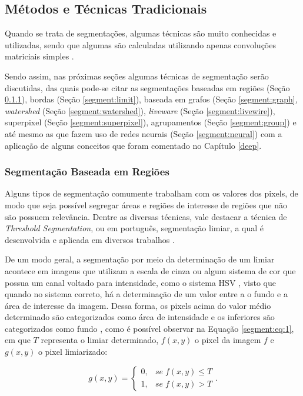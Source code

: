 \subsection{Métodos e Técnicas Tradicionais}
\label{segment:segment}

Quando se trata de segmentações, algumas técnicas são muito conhecidas e utilizadas, sendo que algumas são calculadas utilizando apenas convoluções matriciais simples \citep{Yuheng2017}.

Sendo assim, nas próximas seções algumas técnicas de segmentação serão discutidas, das quais pode-se citar as segmentações baseadas em regiões (Seção \ref{segment:region}), bordas  (Seção \ref{segment:limit}), baseada em grafos (Seção \ref{segment:graph}, \textit{watershed} (Seção \ref{segment:watershed}), \textit{liveware} (Seção \ref{segment:livewire}), superpixel (Seção \ref{segment:superpixel}), agrupamentos (Seção \ref{segment:group}) e até mesmo as que fazem uso de redes neurais  (Seção \ref{segment:neural}) com a aplicação de alguns conceitos que foram comentado no Capítulo \ref{deep}.

\subsubsection{Segmentação Baseada em Regiões}
\label{segment:region}

Alguns tipos de segmentação comumente trabalham com os valores dos pixels, de modo que seja possível segregar áreas e regiões de interesse de regiões que não são possuem relevância. Dentre as diversas técnicas, vale destacar a técnica de \textit{Threshold Segmentation}, ou em português, segmentação limiar, a qual é desenvolvida e aplicada em diversos trabalhos \citep{Yanowitz1989}.

De um modo geral, a segmentação por meio da determinação de um limiar acontece em imagens que utilizam a escala de cinza ou algum sistema de cor que possua um canal voltado para intensidade, como o sistema HSV \citep{schneider2003experimentos}, visto que quando no sistema correto, há a determinação de um valor entre a o fundo e a área de interesse da imagem. Dessa forma, os pixels acima do valor médio determinado são categorizados como área de intensidade e os inferiores são categorizados como fundo \citep{pedrini2008analise}, como é possível observar na Equação \ref{segment:eq:1}, em que $T$ representa o limiar determinado, $f(x,y)$ o pixel da imagem $f$ e $g(x,y)$ o pixel limiarizado:

\begin{equation}
\label{segment:eq:1}
    g(x,y) = \begin{cases}
        0,& se \; f(x,y) \leq T \\
        1,& se \; f(x,y) > T
    \end{cases}.
\end{equation}

